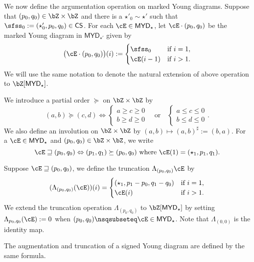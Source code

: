 \documentclass[12pt,a4paper]{amsart}
\def\MYD{{\mathsf{MYD}}}
\numberwithin{equation}{section}
\theoremstyle{remark}
\begin{document}
\medskip

We now define the argumentation operation on marked Young diagrams.
Suppose that $(p_{0},q_{0})\in \bZ\times \bZ$ and there is a
$\star'_{0}\sim \star'$ such that
$\sfss_{0} := (\star'_{0},p_{0},q_{0})\in \CCSS$.
For each $\cE\in \MYD_{\star}$,
let $\cE\cdot (p_{0},q_{0})$ be the marked Young diagram in $\MYD_{\star'}$ given by
\[
  \big(\cE\cdot (p_{0},q_{0})\big)(i) :=
  \begin{cases}
    \sfss_{0} & \text{if } i=1,\\
    \cE(i-1) & \text{if } i>1.
  \end{cases}
\]
We will use the same notation to denote the  natural extension of above
operation to $\bZ[\MYD_{\star}]$.

\medskip

We introduce a partial order $\succeq$ on $\bZ\times \bZ$ by
\[
  (a,b) \succeq (c,d) \Leftrightarrow
  \begin{cases}a\geq c\geq 0\\ b\geq d\geq 0\end{cases}
  \quad  \text{or} \quad
  \begin{cases} a\leq c\leq 0\\ b\leq d\leq 0 \end{cases}.
\]
We also define an involution on $\bZ\times \bZ$ %
by $(a,b)\mapsto (a,b)^{\sharp}:=(b,a)$. For a $\cE\in \MYD_{\star}$ and $(p_{0},q_{0})\in \bZ\times \bZ$, we write
\begin{equation}
  \label{eq:sub}
  \cE\sqsupseteq (p_{0},q_{0}) \Leftrightarrow
  (p_{1},q_{1})\succeq (p_{0},q_{0})
  \text{ where }\cE(1) = (\star_{1},p_{1},q_{1}).
\end{equation}

Suppose $\cE\sqsupseteq (p_{0},q_{0})$, we define the truncation
$\Lambda_{(p_0,q_0)}\cE$ by
\[
  (\Lambda_{(p_{0},q_{0})}(\cE))(i) = \begin{cases}
    (\star_{1},p_{1}-p_{0},q_{1}-q_{0}) & \text{if } i=1,\\
    \cE(i) & \text{if } i>1.
  \end{cases}
\]
We extend the truncation operation $\Lambda_{( p_{0},q_{0} )}$ to
$\bZ[\MYD_{\star}]$
by setting $\Lambda_{p_{0},q_{0}}(\cE) := 0$ when $(p_{0},q_{0})\nsqsubseteq \cE\in \MYD_{\star}$.
Note that $\Lambda_{(0,0)}$ is the identity map.

The augmentation and truncation of a signed Young diagram are defined by the same
formula.
\end{document}
